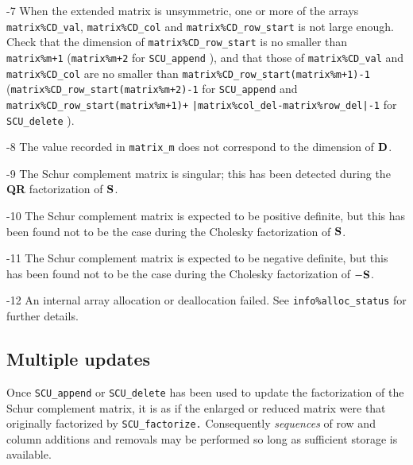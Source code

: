 \documentclass{galahad}
\newcommand{\packagename}{SCU}
\begin{document}
\begin{description}
\item{-7} When the extended matrix is unsymmetric, one or more of the arrays
{\tt matrix\%CD\_val}, {\tt matrix\%CD\_col} and
{\tt matrix\%CD\_row\_start} is not large enough. Check that the dimension
of {\tt matrix\%CD\_row\_start} is no smaller than {\tt matrix\%m+1}
({\tt matrix\%m+2} for {\tt \packagename\_append} ), and that those of
{\tt matrix\%CD\_val} and {\tt matrix\%CD\_col} are no smaller than
{\tt matrix\%CD\_row\_start(matrix\%m+1)-1}
({\tt matrix\%CD\_row\_start(matrix\%m+2)-1} for {\tt \packagename\_app\-end}
and {\tt matrix\%CD\_row\_start(matrix\%m+1)+}
{\tt |matrix\%col\_del-matrix\%row\_del|-1} for {\tt \packagename\_delete} ).

\item{-8} The value recorded in {\tt matrix\_m} does not correspond to the
dimension of ${\mathbf{D}}$.

\item{-9} The Schur complement matrix is singular; this has been
detected during the {\bf QR } factorization of ${\mathbf{S}}$.

\item{-10} The Schur complement matrix is expected to be positive definite,
but this has been found not to be the case
during the Cholesky factorization of ${\mathbf{S}}$.

\item{-11} The Schur complement matrix is expected to be negative definite,
but this has been found not to be the case
during the Cholesky factorization of $-  {\mathbf{S}}$.

\item{-12} An internal array allocation or deallocation failed.
See {\tt info\%alloc\_status} for further details.

\end{description}


\subsection{Multiple updates}
Once {\tt \packagename\_append} or {\tt \packagename\_delete}
has been used to update the factorization of
the Schur complement matrix, it is as if the enlarged or
reduced matrix were
that originally factorized by {\tt \packagename\_factorize.}
Consequently {\em sequences} of row and column additions and removals
may be performed so long as sufficient storage is
available.
\end{document}
